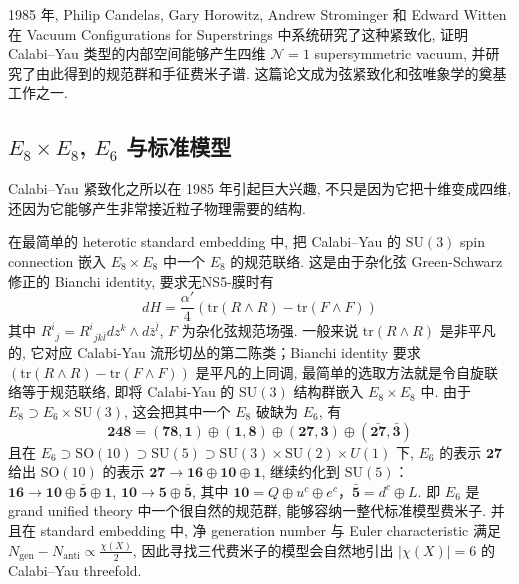 \documentclass[10pt]{article}
\numberwithin{equation}{section}
\begin{document}
1985 年, Philip Candelas, Gary Horowitz, Andrew Strominger 和 Edward Witten 在 Vacuum Configurations for Superstrings 中系统研究了这种紧致化, 证明 Calabi–Yau 类型的内部空间能够产生四维 $\mathcal N=1$ supersymmetric vacuum, 并研究了由此得到的规范群和手征费米子谱. 这篇论文成为弦紧致化和弦唯象学的奠基工作之一\cite{CandelasHorowitzStromingerWitten1985}. 

\subsection{$E_8\times E_8$, $E_6$ 与标准模型}

Calabi–Yau 紧致化之所以在 1985 年引起巨大兴趣, 不只是因为它把十维变成四维, 还因为它能够产生非常接近粒子物理需要的结构. 

在最简单的 heterotic standard embedding 中, 把 Calabi–Yau 的 $\mathrm{SU}(3)$ spin connection 嵌入 $E_8\times E_8$ 中一个 $E_8$ 的规范联络. 这是由于杂化弦 Green-Schwarz 修正的 Bianchi identity, 要求无NS5-膜时有
\begin{equation}
dH=\frac{\alpha'}{4}(\mathrm{tr}(R\wedge R)-\mathrm{tr}(F\wedge F))
\end{equation}
其中 ${R^i}_{j}={R^i}_{jk\bar{l}}dz^k\wedge d\bar{z}^{\bar{l}}$, $F$ 为杂化弦规范场强. 一般来说 $\mathrm{tr}(R\wedge R)$ 是非平凡的, 它对应 Calabi-Yau 流形切丛的第二陈类；Bianchi identity 要求 $(\mathrm{tr}(R\wedge R)-\mathrm{tr}(F\wedge F))$ 是平凡的上同调, 最简单的选取方法就是令自旋联络等于规范联络, 即将 Calabi-Yau 的 $\mathrm{SU}(3)$ 结构群嵌入 $E_{8}\times E_{8}$ 中. 由于 $E_8\supset E_6\times \mathrm{SU}(3)$, 这会把其中一个 $E_8$ 破缺为 $E_6$\cite{CandelasHorowitzStromingerWitten1985}, 有
\begin{equation}
\mathbf{248}=(\mathbf{78},\mathbf1)\oplus(\mathbf1,\mathbf8)\oplus(\mathbf{27},\mathbf3)\oplus(\bar{\mathbf{27}},\bar{\mathbf3})
\end{equation}
且在 $E_{6}\supset \mathrm{SO}(10)\supset \mathrm{SU}(5)\supset \mathrm{SU}(3)\times \mathrm{SU}(2)\times U(1)$ 下, $E_{6}$ 的表示 $\mathbf{27}$ 给出 $\mathrm{SO}(10)$ 的表示
$\mathbf{27}\to \mathbf{16}\oplus \mathbf{10}\oplus \mathbf{1}$, 继续约化到 $\mathrm{SU}(5)$：$\mathbf{16}\to \mathbf{10}\oplus \overline{\mathbf{5}}\oplus\mathbf{1}$, $\mathbf{10}\to \mathbf{5}\oplus \overline{\mathbf{5}}$, 其中 $\mathbf{10}=Q\oplus u^c\oplus e^c$，$\bar{\mathbf5}=d^c\oplus L$. 即 $E_6$ 是 grand unified theory 中一个很自然的规范群, 能够容纳一整代标准模型费米子. 并且在 standard embedding 中, 净 generation number 与 Euler characteristic 满足 $N_{\mathrm{gen}}-N_{\mathrm{anti}}\propto \frac{\chi(X)}2$, 因此寻找三代费米子的模型会自然地引出 $|\chi(X)|=6$ 的 Calabi–Yau threefold. 
\end{document}
